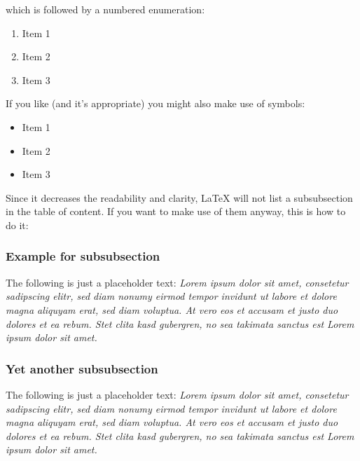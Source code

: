 which is followed by a numbered enumeration:

\begin{enumerate}
	\item Item 1
	\item Item 2
	\item Item 3
\end{enumerate}

If you like (and it's appropriate) you might also make use of symbols:

\begin{itemize}
\renewcommand{\labelitemi}{$\rightarrow$}
	\item Item 1
	\item Item 2
	\item Item 3
\end{itemize}

Since it decreases the readability and clarity, \LaTeX{} will not list a subsubsection in the table of content. If you want to make use of them anyway, this is how to do it:

\subsubsection{Example for subsubsection} %
\label{ssub:example_for_subsubsection}

The following is just a placeholder text: \emph{Lorem ipsum dolor sit amet, consetetur sadipscing elitr, sed diam nonumy eirmod tempor invidunt ut labore et dolore magna aliquyam erat, sed diam voluptua. At vero eos et accusam et justo duo dolores et ea rebum. Stet clita kasd gubergren, no sea takimata sanctus est Lorem ipsum dolor sit amet.}


\subsubsection{Yet another subsubsection} %
\label{ssub:yet_another_subsubsection}

The following is just a placeholder text: \emph{Lorem ipsum dolor sit amet, consetetur sadipscing elitr, sed diam nonumy eirmod tempor invidunt ut labore et dolore magna aliquyam erat, sed diam voluptua. At vero eos et accusam et justo duo dolores et ea rebum. Stet clita kasd gubergren, no sea takimata sanctus est Lorem ipsum dolor sit amet.}


